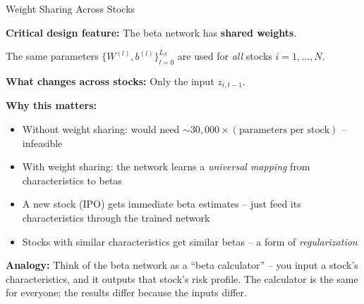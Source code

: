 \documentclass[aspectratio=169]{beamer}
\begin{document}
\begin{frame}{Weight Sharing Across Stocks}

\textbf{Critical design feature:} The beta network has \textbf{shared weights}.

\vspace{0.5em}
The same parameters $\{W^{(l)}, b^{(l)}\}_{l=0}^{L_\beta}$ are used for \emph{all} stocks $i = 1, \ldots, N$.

\vspace{0.5em}
\textbf{What changes across stocks:} Only the input $z_{i,t-1}$.

\vspace{0.5em}
\textbf{Why this matters:}
\begin{itemize}
    \item Without weight sharing: would need $\sim 30{,}000 \times (\text{parameters per stock})$ -- infeasible
    \item With weight sharing: the network learns a \emph{universal mapping} from characteristics to betas
    \item A new stock (IPO) gets immediate beta estimates -- just feed its characteristics through the trained network
    \item Stocks with similar characteristics get similar betas -- a form of \emph{regularization}
\end{itemize}

\vspace{0.5em}
\textbf{Analogy:} Think of the beta network as a ``beta calculator'' -- you input a stock's characteristics, and it outputs that stock's risk profile. The calculator is the same for everyone; the results differ because the inputs differ.
\end{frame}
%
\end{document}
